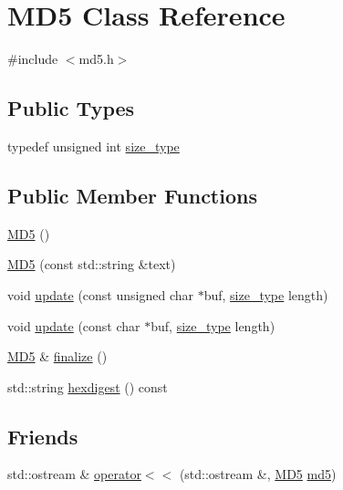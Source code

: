 \hypertarget{classMD5}{\section{M\-D5 Class Reference}
\label{classMD5}
}


{\ttfamily \#include $<$md5.\-h$>$}

\subsection*{Public Types}
\begin{DoxyCompactItemize}
\item 
typedef unsigned int \hyperlink{classMD5_aa836972700679dbcff6ae8337f6db464}{size\-\_\-type}
\end{DoxyCompactItemize}
\subsection*{Public Member Functions}
\begin{DoxyCompactItemize}
\item 
\hyperlink{classMD5_afa6155ec36de415ab2dcf5e54b670d13}{M\-D5} ()
\item 
\hyperlink{classMD5_a155356ffd713345e69e6dcbd9f8da6ce}{M\-D5} (const std\-::string \&text)
\item 
void \hyperlink{classMD5_ac5ddf6cd8f940422396d321ea90ed045}{update} (const unsigned char $\ast$buf, \hyperlink{classMD5_aa836972700679dbcff6ae8337f6db464}{size\-\_\-type} length)
\item 
void \hyperlink{classMD5_ac5ccba375539b993958fb235f8ac849c}{update} (const char $\ast$buf, \hyperlink{classMD5_aa836972700679dbcff6ae8337f6db464}{size\-\_\-type} length)
\item 
\hyperlink{classMD5}{M\-D5} \& \hyperlink{classMD5_a10f607494a3f2e3e515fc4b99d1a06cc}{finalize} ()
\item 
std\-::string \hyperlink{classMD5_ad36c65acf87e397bf717bc3defbc0c7a}{hexdigest} () const 
\end{DoxyCompactItemize}
\subsection*{Friends}
\begin{DoxyCompactItemize}
\item 
std\-::ostream \& \hyperlink{classMD5_a0739666fd0f3a7117546f6c50e0783b2}{operator$<$$<$} (std\-::ostream \&, \hyperlink{classMD5}{M\-D5} \hyperlink{md5_8h_a92c6eed2e9b51298af559aff6792770b}{md5})
\end{DoxyCompactItemize}


